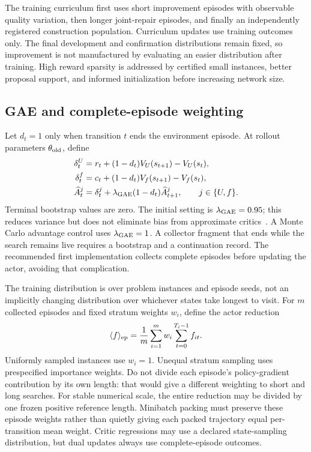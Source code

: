 \documentclass[11pt,a4paper]{article}
\theoremstyle{definition}\newtheorem{definition}[proposition]{Definition}
\begin{document}
The training curriculum first uses short improvement episodes with observable quality variation,
then longer joint-repair episodes, and finally an independently registered construction population.
Curriculum updates use training outcomes only. The final development and confirmation distributions
remain fixed, so improvement is not manufactured by evaluating an easier distribution after
training. High reward sparsity is addressed by certified small instances, better proposal support,
and informed initialization before increasing network size.

\subsection{GAE and complete-episode weighting}

Let \(d_t=1\) only when transition \(t\) ends the environment episode. At rollout parameters
\(\theta_{\rm old}\), define
\begin{align}
 \delta_t^U&=r_t+(1-d_t)V_U(s_{t+1})-V_U(s_t),\\
 \delta_t^f&=c_t+(1-d_t)V_f(s_{t+1})-V_f(s_t),\\
 \widehat A_t^j&=\delta_t^j+
 \lambda_{\rm GAE}(1-d_t)\widehat A_{t+1}^j,
 \qquad j\in\{U,f\}.
 \label{eq:rl-gae}
\end{align}
Terminal bootstrap values are zero. The initial setting is \(\lambda_{\rm GAE}=0.95\); this
reduces variance but does not eliminate bias from approximate critics~\cite{gae2016}. A
Monte Carlo advantage control uses \(\lambda_{\rm GAE}=1\). A collector fragment that ends while
the search remains live requires a bootstrap and a continuation record. The recommended first
implementation collects complete episodes before updating the actor, avoiding that complication.

The training distribution is over problem instances and episode seeds, not an implicitly changing
distribution over whichever states take longest to visit. For \(m\) collected episodes and fixed
stratum weights \(w_i\), define the actor reduction
\begin{equation}
 \langle f\rangle_{\rm ep}=
 \frac{1}{m}\sum_{i=1}^{m}w_i\sum_{t=0}^{T_i-1}f_{it}.
 \label{eq:rl-episode-reduction}
\end{equation}
Uniformly sampled instances use \(w_i=1\). Unequal stratum sampling uses prespecified importance
weights. Do not divide each episode's policy-gradient contribution by its own length: that would
give a different weighting to short and long searches. For stable numerical scale, the entire
reduction may be divided by one frozen positive reference length. Minibatch packing must preserve
these episode weights rather than quietly giving each packed trajectory equal per-transition mean
weight. Critic regressions may use a declared state-sampling distribution, but dual updates always
use complete-episode outcomes.
\end{document}
